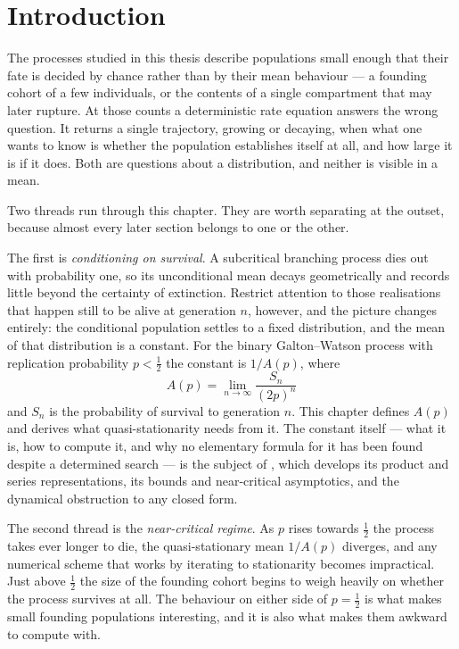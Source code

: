 \section{Introduction}
\label{m:sec:intro}

The processes studied in this thesis describe populations small enough that their
fate is decided by chance rather than by their mean behaviour --- a founding cohort
of a few individuals, or the contents of a single compartment that may later
rupture. At those counts a deterministic rate equation answers the wrong question.
It returns a single trajectory, growing or decaying, when what one wants to know is
whether the population establishes itself at all, and how large it is if it does.
Both are questions about a distribution, and neither is visible in a mean.

Two threads run through this chapter. They are worth separating at the outset,
because almost every later section belongs to one or the other.

The first is \emph{conditioning on survival}. A subcritical branching process dies
out with probability one, so its unconditional mean decays geometrically and
records little beyond the certainty of extinction. Restrict attention to those
realisations that happen still to be alive at generation $n$, however, and the
picture changes entirely: the conditional population settles to a fixed
distribution, and the mean of that distribution is a constant. For the binary
Galton--Watson process with replication probability $p<\tfrac12$ the constant is
$1/A(p)$, where
\begin{equation*}
A(p) = \lim_{n\to\infty}\frac{S_n}{(2p)^n}
\end{equation*}
and $S_n$ is the probability of survival to generation $n$. This chapter defines
$A(p)$ and derives what quasi-stationarity needs from it. The constant itself ---
what it is, how to compute it, and why no elementary formula for it has been found
despite a determined search --- is the subject of \ChA, which develops its product
and series representations, its bounds and near-critical asymptotics, and the
dynamical obstruction to any closed form.

The second thread is the \emph{near-critical regime}. As $p$ rises towards
$\tfrac12$ the process takes ever longer to die, the quasi-stationary mean $1/A(p)$
diverges, and any numerical scheme that works by iterating to stationarity becomes
impractical. Just above $\tfrac12$ the size of the founding cohort begins to weigh
heavily on whether the process survives at all. The behaviour on either side of
$p=\tfrac12$ is what makes small founding populations interesting, and it is also
what makes them awkward to compute with.

